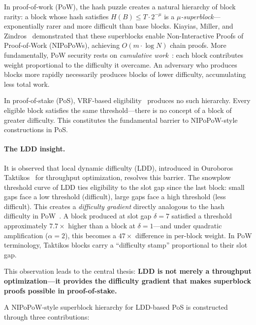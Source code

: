 \documentclass[11pt]{article}
\begin{document}
In proof-of-work (PoW), the hash puzzle creates a natural hierarchy of block rarity: a block whose hash satisfies $H(B) \leq T \cdot 2^{-\mu}$ is a \emph{$\mu$-superblock}---exponentially rarer and more difficult than base blocks. Kiayias, Miller, and Zindros~\cite{nipopows} demonstrated that these superblocks enable Non-Interactive Proofs of Proof-of-Work (NIPoPoWs), achieving $O(m \cdot \log N)$ chain proofs. More fundamentally, PoW security rests on \emph{cumulative work}~\cite{backbone}: each block contributes weight proportional to the difficulty it overcame. An adversary who produces blocks more rapidly necessarily produces blocks of lower difficulty, accumulating less total work.

In proof-of-stake (PoS), VRF-based eligibility~\cite{vrf} produces no such hierarchy. Every eligible block satisfies the same threshold---there is no concept of a block of greater difficulty. This constitutes the fundamental barrier to NIPoPoW-style constructions in PoS.

\paragraph{The LDD insight.} It is observed that local dynamic difficulty (LDD), introduced in Ouroboros Taktikos~\cite{taktikos} for throughput optimization, resolves this barrier. The snowplow threshold curve of LDD ties eligibility to the slot gap since the last block: small gaps face a low threshold (difficult), large gaps face a high threshold (less difficult). This creates a \emph{difficulty gradient} directly analogous to the hash difficulty in PoW~\cite{nakamoto}. A block produced at slot gap $\delta = 7$ satisfied a threshold approximately $7.7\times$ higher than a block at $\delta = 1$---and under quadratic amplification ($\alpha = 2$), this becomes a $47\times$ difference in per-block weight. In PoW terminology, Taktikos blocks carry a ``difficulty stamp'' proportional to their slot gap.

This observation leads to the central thesis: \textbf{LDD is not merely a throughput optimization---it provides the difficulty gradient that makes superblock proofs possible in proof-of-stake.}

A NIPoPoW-style superblock hierarchy for LDD-based PoS is constructed through three contributions:
\end{document}
